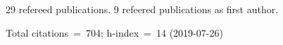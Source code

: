 29 refereed publications. 9 refeered publications as first author.

Total citations~=~704; h-index~=~14 (2019-07-26)